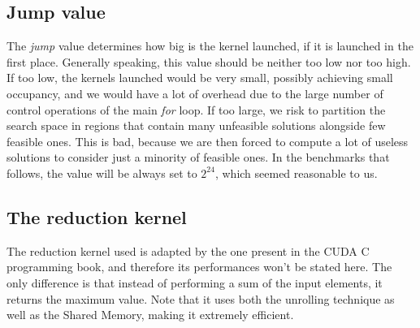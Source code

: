 \documentclass[12pt]{extarticle}
\begin{document}
 \subsection{Jump value}
 The \emph{jump} value determines how big is the kernel launched, if it is launched in the first place. Generally speaking, this value should be neither too low nor too high. If too low, the kernels launched would be very small, possibly achieving small occupancy, and we would have a lot of overhead due to the large number of control operations of the main \emph{for} loop. If too large, we risk to partition the search space in regions that contain many unfeasible solutions alongside few feasible ones. This is bad, because we are then forced to compute a lot of useless solutions to consider just a minority of feasible ones. In the benchmarks that follows, the value will be always set to $2^{24}$, which seemed reasonable to us.
 \subsection{The reduction kernel}
 The reduction kernel used is adapted by the one present in the CUDA C programming book\cite{cuda_c_programming:textbook}, and therefore its performances won't be stated here. The only difference is that instead of performing a sum of the input elements, it returns the maximum value. Note that it uses both the unrolling technique as well as the Shared Memory, making it extremely efficient.
 
\end{document}
